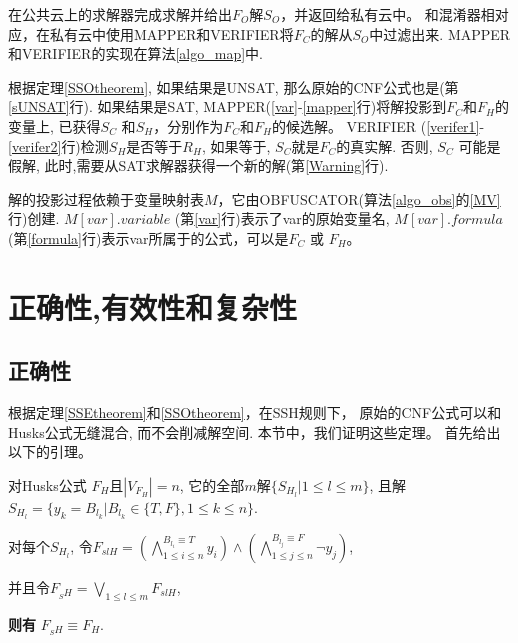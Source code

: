 在公共云上的求解器完成求解并给出$F_O$解$S_O$，并返回给私有云中。
和混淆器相对应，在私有云中使用MAPPER和VERIFIER将$F_C$的解从$S_O$中过滤出来.
MAPPER和VERIFIER的实现在算法\ref{algo_map}中.

根据定理\ref{SSOtheorem},
如果结果是UNSAT, 那么原始的CNF公式也是(第\ref{sUNSAT}行).
如果结果是SAT, MAPPER(\ref{var}-\ref{mapper}行)将解投影到$F_C$和$F_H$的变量上,
已获得$S_C$ 和$S_H$，分别作为$F_C$和$F_H$的候选解。
VERIFIER (\ref{verifer1}-\ref{verifer2}行)检测$S_H$是否等于$R_H$,
如果等于, $S_C$就是$F_C$的真实解.
否则, $S_C$ 可能是假解,
此时,需要从SAT求解器获得一个新的解(第\ref{Warning}行).

解的投影过程依赖于变量映射表$M$，它由OBFUSCATOR(算法\ref{algo_obs}的\ref{MV}行)创建.
$M[var].variable$ (第\ref{var}行)表示了var的原始变量名,
$M[var].formula$ (第\ref{formula}行)表示var所属于的公式，可以是$F_C$ 或 $F_H$。
\section{正确性,有效性和复杂性}
\subsection{正确性}\label{correctness}
根据定理\ref{SSEtheorem}和\ref{SSOtheorem}，在SSH规则下，
原始的CNF公式可以和Husks公式无缝混合, 而不会削减解空间.
本节中，我们证明这些定理。
首先给出以下的引理。

\begin{lemma}\label{HE}

对Husks公式 ${F_H}$且$|V_{F_H}|= n$,
它的全部$m$解$\{S_{H_l}|1\leqslant l\leqslant m\}$,
且解$S_{H_l}=\{y_k=B_{l_k}|B_{l_k} \in \{T,F\}, 1\leqslant k\leqslant n\}$.

对每个$S_{H_l}$, 令$F_{slH}=
(\bigwedge_{1\leqslant i\leqslant n}^{B_{l_i}\equiv T}y_{i})\wedge
(\bigwedge_{1\leqslant j\leqslant n}^{B_{l_j}\equiv F}\neg y_{j})$,

并且令$F_{_SH}=\bigvee_{1\leqslant l\leqslant m}F_{slH}$,

\textbf{则有}  $F_{_SH} \equiv F_H $.
\end{lemma}

